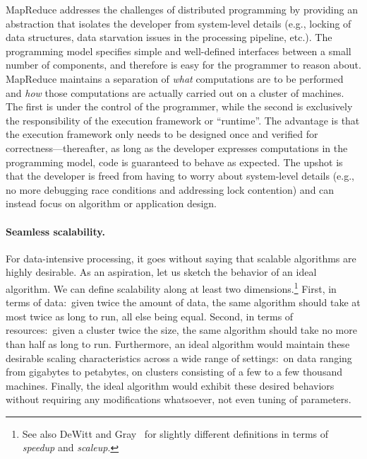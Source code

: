 MapReduce addresses the challenges of distributed programming by
providing an abstraction that isolates the developer from system-level
details (e.g., locking of data structures, data starvation issues in
the processing pipeline, etc.).  The programming model specifies
simple and well-defined interfaces between a small number of
components, and therefore is easy for the programmer to reason about.
MapReduce maintains a separation of \emph{what} computations are to be
performed and \emph{how} those computations are actually carried out on
a cluster of machines.  The first is under the control of the
programmer, while the second is exclusively the responsibility of the
execution framework or ``runtime''.  The advantage is that the
execution framework only needs to be designed once and verified for
correctness---thereafter, as long as the developer expresses
computations in the programming model, code is guaranteed to behave as
expected.  The upshot is that the developer is freed from having to
worry about system-level details (e.g., no more debugging race
conditions and addressing lock contention) and can instead focus on
algorithm or application design.

\paragraph{Seamless scalability.}
For data-intensive processing, it goes without saying that scalable
algorithms are highly desirable.  As an aspiration, let us sketch the
behavior of an ideal algorithm.  We can define scalability along at
least two dimensions.\footnote{See also DeWitt and
  Gray~\cite{DeWitt_Gray_CACM1992} for slightly different definitions
  in terms of \emph{speedup} and \emph{scaleup}.}  First, in terms of
data:\ given twice the amount of data, the same algorithm should take
at most twice as long to run, all else being equal.  Second, in terms
of resources:\ given a cluster twice the size, the same algorithm
should take no more than half as long to run.  Furthermore, an ideal
algorithm would maintain these desirable scaling characteristics
across a wide range of settings:\ on data ranging from gigabytes to
petabytes, on clusters consisting of a few to a few thousand machines.
Finally, the ideal algorithm would exhibit these desired behaviors
without requiring any modifications whatsoever, not even tuning of
parameters.

